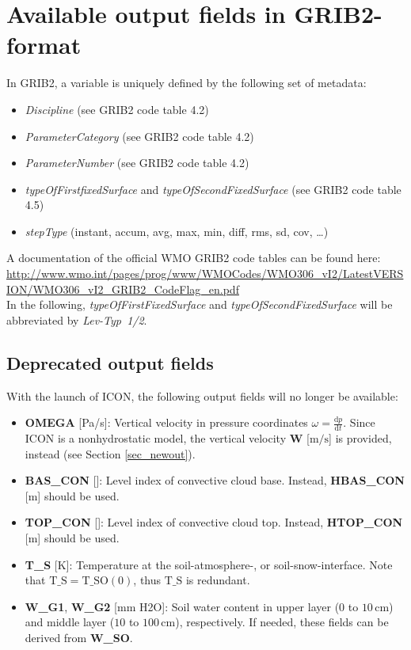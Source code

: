 \chapter{Available output fields in GRIB2-format}

\newcommand{\rb}[1]{\raisebox{4.0ex}[0pt]{#1}}

In GRIB2, a variable is uniquely defined by the following set of metadata:
\begin{itemize}
 \item \emph{Discipline} (see GRIB2 code table 4.2)
 \item \emph{ParameterCategory} (see GRIB2 code table 4.2)
 \item \emph{ParameterNumber} (see GRIB2 code table 4.2)
 \item \emph{typeOfFirstfixedSurface} and \emph{typeOfSecondFixedSurface} (see GRIB2 code table 4.5)
 \item \emph{stepType} (instant, accum, avg, max, min, diff, rms, sd, cov, \dots)
\end{itemize}
A documentation of the official WMO GRIB2 code tables can be found here: \url{http://www.wmo.int/pages/prog/www/WMOCodes/WMO306_vI2/LatestVERSION/WMO306_vI2_GRIB2_CodeFlag_en.pdf}\\
In the following, \emph{typeOfFirstFixedSurface} and \emph{typeOfSecondFixedSurface} will be abbreviated by \emph{Lev-Typ~1/2}.



\section{Deprecated output fields}
With the launch of ICON, the following output fields will no longer be available:

\begin{itemize}
 \item \textbf{OMEGA} [Pa/s]: Vertical velocity in pressure coordinates $\omega=\frac{\mathrm{d}p}{\mathrm{d}t}$. Since ICON is a nonhydrostatic model, the vertical velocity 
                              \textbf{W} [$\mathrm{m/s}$] is provided, instead (see Section \ref{sec_newout}).
 \item \textbf{BAS\_CON} [\textendash]: Level index of convective cloud base. Instead, \textbf{HBAS\_CON} [m] should be used.
 \item \textbf{TOP\_CON} [\textendash]: Level index of convective cloud top. Instead, \textbf{HTOP\_CON} [m] should be used.
 \item \textbf{T\_S} [K]: Temperature at the soil-atmosphere-, or soil-snow-interface. Note that $\mathrm{T\_S} = \mathrm{T\_SO(0)}$, thus $\mathrm{T\_S}$ is redundant.
 \item \textbf{W\_G1}, \textbf{W\_G2}  [mm H2O]: Soil water content in upper layer ($0$ to $10\,\mathrm{cm}$) and middle layer ($10$ to $100\,\mathrm{cm}$), respectively. 
                                                 If needed, these fields can be derived from \textbf{W\_SO}.
\end{itemize}



